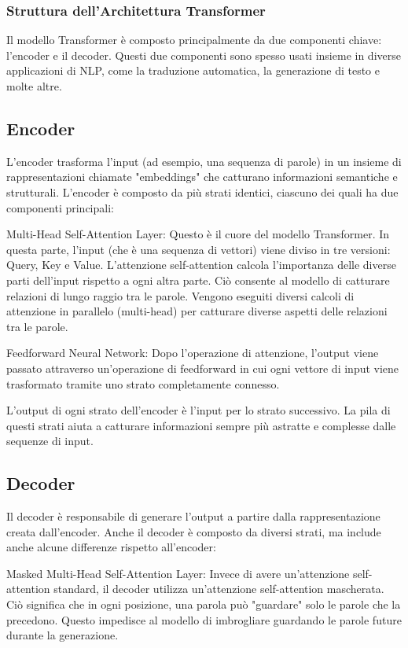 \subsubsection{Struttura dell'Architettura Transformer}

Il modello Transformer è composto principalmente da due componenti chiave: l'encoder e il decoder. Questi due componenti sono spesso usati insieme in diverse applicazioni di NLP, come la traduzione automatica, la generazione di testo e molte altre.

\subsection{Encoder}
L'encoder trasforma l'input (ad esempio, una sequenza di parole) in un insieme di rappresentazioni chiamate "embeddings" che catturano informazioni semantiche e strutturali. L'encoder è composto da più strati identici, ciascuno dei quali ha due componenti principali:

Multi-Head Self-Attention Layer: Questo è il cuore del modello Transformer. In questa parte, l'input (che è una sequenza di vettori) viene diviso in tre versioni: Query, Key e Value. L'attenzione self-attention calcola l'importanza delle diverse parti dell'input rispetto a ogni altra parte. Ciò consente al modello di catturare relazioni di lungo raggio tra le parole. Vengono eseguiti diversi calcoli di attenzione in parallelo (multi-head) per catturare diverse aspetti delle relazioni tra le parole.

Feedforward Neural Network: Dopo l'operazione di attenzione, l'output viene passato attraverso un'operazione di feedforward in cui ogni vettore di input viene trasformato tramite uno strato completamente connesso.

L'output di ogni strato dell'encoder è l'input per lo strato successivo. La pila di questi strati aiuta a catturare informazioni sempre più astratte e complesse dalle sequenze di input.

\subsection{Decoder}
Il decoder è responsabile di generare l'output a partire dalla rappresentazione creata dall'encoder. Anche il decoder è composto da diversi strati, ma include anche alcune differenze rispetto all'encoder:

Masked Multi-Head Self-Attention Layer: Invece di avere un'attenzione self-attention standard, il decoder utilizza un'attenzione self-attention mascherata. Ciò significa che in ogni posizione, una parola può "guardare" solo le parole che la precedono. Questo impedisce al modello di imbrogliare guardando le parole future durante la generazione.

